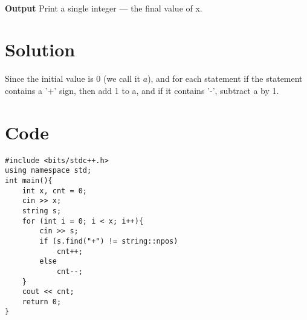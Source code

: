 \documentclass{article}
\begin{document}
\\\textbf{Output}
Print a single integer — the final value of x.

\section{Solution}

Since the initial value is 0 (we call it $a$), and for each statement if the statement contains a '+' sign, then add 1 to a, and if it contains '-', subtract a by 1.


\newpage
\section{Code}

\begin{lstlisting}
#include <bits/stdc++.h>
using namespace std;
int main(){
    int x, cnt = 0;
    cin >> x;
    string s;
    for (int i = 0; i < x; i++){
        cin >> s;
        if (s.find("+") != string::npos)
            cnt++;
        else
            cnt--;
    }
    cout << cnt;
    return 0;
}
\end{lstlisting}
\end{document}
